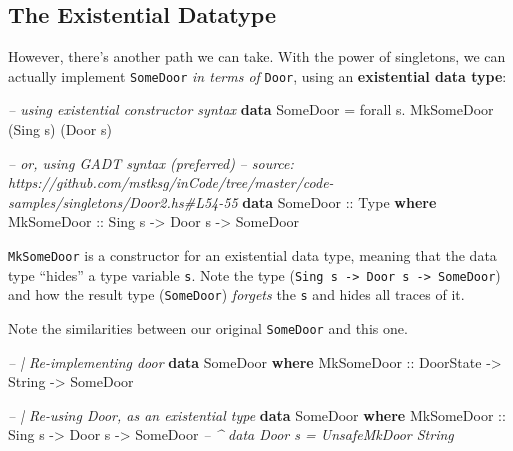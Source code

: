 \documentclass[]{article}
\newenvironment{Shaded}{}{}
\newcommand{\KeywordTok}[1]{\textcolor[rgb]{0.00,0.44,0.13}{\textbf{#1}}}
\newcommand{\DataTypeTok}[1]{\textcolor[rgb]{0.56,0.13,0.00}{#1}}
\newcommand{\CommentTok}[1]{\textcolor[rgb]{0.38,0.63,0.69}{\textit{#1}}}
\newcommand{\OtherTok}[1]{\textcolor[rgb]{0.00,0.44,0.13}{#1}}
\newcommand{\FunctionTok}[1]{\textcolor[rgb]{0.02,0.16,0.49}{#1}}
\newcommand{\NormalTok}[1]{#1}
\begin{document}
\subsection{The Existential Datatype}\label{the-existential-datatype}

However, there's another path we can take. With the power of singletons, we can
actually implement \texttt{SomeDoor} \emph{in terms of} \texttt{Door}, using an
\textbf{existential data type}:

\begin{Shaded}
\begin{Highlighting}[]
\CommentTok{-- using existential constructor syntax}
\KeywordTok{data} \DataTypeTok{SomeDoor} \FunctionTok{=}\NormalTok{ forall s}\FunctionTok{.} \DataTypeTok{MkSomeDoor}\NormalTok{ (}\DataTypeTok{Sing}\NormalTok{ s) (}\DataTypeTok{Door}\NormalTok{ s)}

\CommentTok{-- or, using GADT syntax (preferred)}
\CommentTok{-- source: https://github.com/mstksg/inCode/tree/master/code-samples/singletons/Door2.hs#L54-55}
\KeywordTok{data} \DataTypeTok{SomeDoor}\OtherTok{ ::} \DataTypeTok{Type} \KeywordTok{where}
    \DataTypeTok{MkSomeDoor}\OtherTok{ ::} \DataTypeTok{Sing}\NormalTok{ s }\OtherTok{->} \DataTypeTok{Door}\NormalTok{ s }\OtherTok{->} \DataTypeTok{SomeDoor}
\end{Highlighting}
\end{Shaded}

\texttt{MkSomeDoor} is a constructor for an existential data type, meaning that
the data type ``hides'' a type variable \texttt{s}. Note the type
(\texttt{Sing\ s\ -\textgreater{}\ Door\ s\ -\textgreater{}\ SomeDoor}) and how
the result type (\texttt{SomeDoor}) \emph{forgets} the \texttt{s} and hides all
traces of it.

Note the similarities between our original \texttt{SomeDoor} and this one.

\begin{Shaded}
\begin{Highlighting}[]
\CommentTok{-- | Re-implementing door}
\KeywordTok{data} \DataTypeTok{SomeDoor} \KeywordTok{where}
    \DataTypeTok{MkSomeDoor}\OtherTok{ ::} \DataTypeTok{DoorState} \OtherTok{->} \DataTypeTok{String} \OtherTok{->} \DataTypeTok{SomeDoor}

\CommentTok{-- | Re-using Door, as an existential type}
\KeywordTok{data} \DataTypeTok{SomeDoor} \KeywordTok{where}
    \DataTypeTok{MkSomeDoor}\OtherTok{  ::} \DataTypeTok{Sing}\NormalTok{ s  }\OtherTok{->} \DataTypeTok{Door}\NormalTok{ s }\OtherTok{->} \DataTypeTok{SomeDoor}
                            \CommentTok{-- ^ data Door s = UnsafeMkDoor String}
\end{Highlighting}
\end{Shaded}
\end{document}
